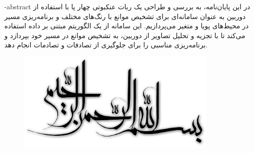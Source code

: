 
\fa-abstract{
	در این پایان‌نامه، به بررسی و طراحی یک ربات عنکبوتی چهار پا با استفاده از دوربین به عنوان سامانه‌ای برای تشخیص موانع با رنگ‌های مختلف و برنامه‌ریزی مسیر در محیط‌های پویا و متغیر می‌پردازیم. این سامانه از یک الگوریتم مبتنی بر داده استفاده می‌کند تا با تجزیه و تحلیل تصاویر از دوربین، به تشخیص موانع در مسیر خود بپردازد و برنامه‌ریزی مناسبی را برای جلوگیری از تصادفات و تصادمات انجام دهد.
}





\AUTtitle
\vspace*{7cm}
\thispagestyle{empty}
\begin{center}
	\includegraphics[height=5cm,width=12cm]{besm}
\end{center}